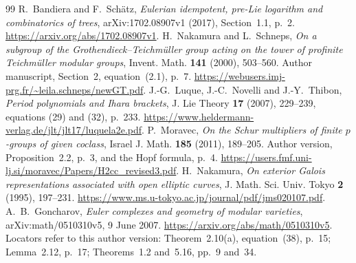 \documentclass[11pt]{article}
\theoremstyle{definition}\newtheorem{definition}[theorem]{Definition}
\begin{document}
\begin{thebibliography}{99}
R.~Bandiera and F.~Sch\"atz,
\emph{Eulerian idempotent, pre-Lie logarithm and combinatorics of trees},
arXiv:1702.08907v1 (2017), Section~1.1, p.~2.
\url{https://arxiv.org/abs/1702.08907v1}.
H.~Nakamura and L.~Schneps, \emph{On a subgroup of the Grothendieck--Teichm\"uller group acting on the tower of profinite Teichm\"uller modular groups}, Invent. Math. \textbf{141} (2000), 503--560. Author manuscript, Section~2, equation~(2.1), p.~7. \url{https://webusers.imj-prg.fr/~leila.schneps/newGT.pdf}.
J.-G.~Luque, J.-C.~Novelli and J.-Y.~Thibon,
\emph{Period polynomials and Ihara brackets},
J. Lie Theory \textbf{17} (2007), 229--239,
equations (29) and (32), p.~233.
\url{https://www.heldermann-verlag.de/jlt/jlt17/luquela2e.pdf}.
P.~Moravec, \emph{On the Schur multipliers of finite $p$-groups of given coclass},
Israel J. Math. \textbf{185} (2011), 189--205.
Author version, Proposition~2.2, p.~3, and the Hopf formula, p.~4.
\url{https://users.fmf.uni-lj.si/moravec/Papers/H2cc_revised3.pdf}.
H.~Nakamura, \emph{On exterior Galois representations associated with open elliptic curves},
J. Math. Sci. Univ. Tokyo \textbf{2} (1995), 197--231.
\url{https://www.ms.u-tokyo.ac.jp/journal/pdf/jms020107.pdf}.
A.~B.~Goncharov, \emph{Euler complexes and geometry of modular varieties},
arXiv:math/0510310v5, 9 June 2007.
\url{https://arxiv.org/abs/math/0510310v5}.
Locators refer to this author version: Theorem~2.10(a), equation~(38),
p.~15; Lemma~2.12, p.~17; Theorems~1.2 and~5.16, pp.~9 and~34.
\end{thebibliography}
\end{document}

